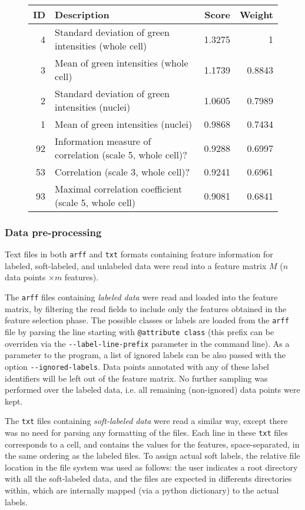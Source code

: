 \documentclass[oneside, a4paper, draft]{memoir} %
\begin{document}
\begin{figure}[here]
\centering
\begin{tabular}{rlrr}
	ID & Description & Score & Weight\\
	\hline
	4 & Standard deviation of green intensities (whole cell) & 1.3275 & 1\\
	3 & Mean of green intensities (whole cell) & 1.1739 & 0.8843\\
	2 & Standard deviation of green intensities (nuclei) & 1.0605 & 0.7989\\
	1 & Mean of green intensities (nuclei) & 0.9868 & 0.7434\\
	92 & Information measure of correlation (scale 5, whole cell)? & 0.9288 & 0.6997\\
    53 & Correlation (scale 3, whole cell)? & 0.9241 & 0.6961\\
	93 & Maximal correlation coefficient (scale 5, whole cell) & 0.9081 & 0.6841
\end{tabular}
\end{figure}

\subsubsection{Data pre-processing}
Text files in both \texttt{arff} and \texttt{txt} formats containing feature information for labeled, soft-labeled,
and unlabeled data were read into a feature matrix $M$ ($n$ data points $\times m$ features).

The \texttt{arff} files containing \emph{labeled data} were read and loaded into the feature matrix, by filtering the
read fields to include only the features obtained in the feature selection phase. The possible classes or labels are
loaded from the \texttt{arf{}f} file by parsing the line starting with \texttt{@attribute class} (this prefix can be
overriden via the \texttt{-{}-label-line-prefix} parameter in the command line). As a parameter to the program, a list
of ignored labels can be also passed with the option \texttt{-{}-ignored-labels}. Data points annotated with any of
these label identifiers will be left out of the feature matrix. No further sampling was performed over the labeled
data, i.e. all remaining (non-ignored) data points were kept.

The \texttt{txt} files containing \emph{soft-labeled data} were read a similar way, except there was no need for
parsing any formatting of the files. Each line in these \texttt{txt} files corresponds to a cell, and contains the
values for the features, space-separated, in the same ordering as the labeled files. To assign actual soft labels, the
relative file location in the file system was used as follows: the user indicates a root directory with all the 
soft-labeled data, and the files are expected in differents directories within, which are internally mapped 
(via a python dictionary) to the actual labels.
\end{document}
